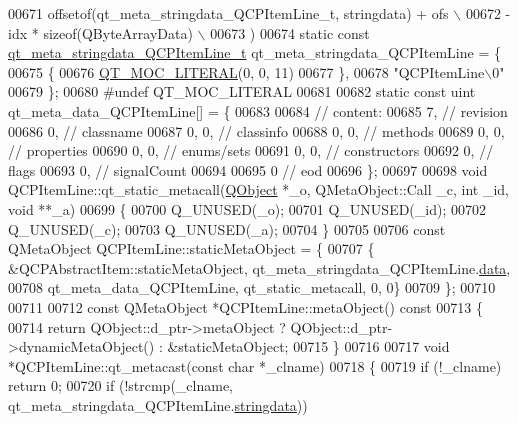 \begin{DoxyCode}
00671 \textcolor{preprocessor}{    offsetof(qt\_meta\_stringdata\_QCPItemLine\_t, stringdata) + ofs \(\backslash\)}
00672 \textcolor{preprocessor}{        - idx * sizeof(QByteArrayData) \(\backslash\)}
00673 \textcolor{preprocessor}{    )}
00674 \textcolor{keyword}{static} \textcolor{keyword}{const} \hyperlink{a00067_dd/de3/a00201}{qt\_meta\_stringdata\_QCPItemLine\_t} 
      qt\_meta\_stringdata\_QCPItemLine = \{
00675     \{
00676 \hyperlink{a00067_a75bb9482d242cde0a06c9dbdc6b83abe}{QT\_MOC\_LITERAL}(0, 0, 11)
00677     \},
00678     \textcolor{stringliteral}{"QCPItemLine\(\backslash\)0"}
00679 \};
00680 \textcolor{preprocessor}{#undef QT\_MOC\_LITERAL}
00681 
00682 \textcolor{keyword}{static} \textcolor{keyword}{const} uint qt\_meta\_data\_QCPItemLine[] = \{
00683 
00684  \textcolor{comment}{// content:}
00685        7,       \textcolor{comment}{// revision}
00686        0,       \textcolor{comment}{// classname}
00687        0,    0, \textcolor{comment}{// classinfo}
00688        0,    0, \textcolor{comment}{// methods}
00689        0,    0, \textcolor{comment}{// properties}
00690        0,    0, \textcolor{comment}{// enums/sets}
00691        0,    0, \textcolor{comment}{// constructors}
00692        0,       \textcolor{comment}{// flags}
00693        0,       \textcolor{comment}{// signalCount}
00694 
00695        0        \textcolor{comment}{// eod}
00696 \};
00697 
00698 \textcolor{keywordtype}{void} QCPItemLine::qt\_static\_metacall(\hyperlink{a00059}{QObject} *\_o, QMetaObject::Call \_c, \textcolor{keywordtype}{int} \_id, \textcolor{keywordtype}{void} **\_a)
00699 \{
00700     Q\_UNUSED(\_o);
00701     Q\_UNUSED(\_id);
00702     Q\_UNUSED(\_c);
00703     Q\_UNUSED(\_a);
00704 \}
00705 
00706 \textcolor{keyword}{const} QMetaObject QCPItemLine::staticMetaObject = \{
00707     \{ &QCPAbstractItem::staticMetaObject, qt\_meta\_stringdata\_QCPItemLine.\hyperlink{a00067_a02b269c84618a73b8cefdb4c4ae888c6}{data},
00708       qt\_meta\_data\_QCPItemLine,  qt\_static\_metacall, 0, 0\}
00709 \};
00710 
00711 
00712 \textcolor{keyword}{const} QMetaObject *QCPItemLine::metaObject()\textcolor{keyword}{ const}
00713 \textcolor{keyword}{}\{
00714     \textcolor{keywordflow}{return} QObject::d\_ptr->metaObject ? QObject::d\_ptr->dynamicMetaObject() : &staticMetaObject;
00715 \}
00716 
00717 \textcolor{keywordtype}{void} *QCPItemLine::qt\_metacast(\textcolor{keyword}{const} \textcolor{keywordtype}{char} *\_clname)
00718 \{
00719     \textcolor{keywordflow}{if} (!\_clname) \textcolor{keywordflow}{return} 0;
00720     \textcolor{keywordflow}{if} (!strcmp(\_clname, qt\_meta\_stringdata\_QCPItemLine.\hyperlink{a00067_ac705c65b9062c112f8ff0dd2a2915160}{stringdata}))

\end{DoxyCode}
